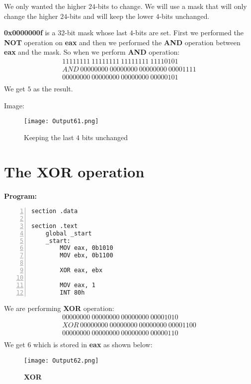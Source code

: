 \documentclass{article}
\begin{document}
We only wanted the higher $24$-bits to change. We will use a mask that will only change the higher $24$-bits and will keep the lower $4$-bits unchanged.

\textbf{0x0000000f} is a $32$-bit mask whose last $4$-bits are set. First we performed the \textbf{NOT} operation on \textbf{eax} and then we performed the \textbf{AND} operation between \textbf{eax} and the mask.
\newpage
So when we perform \textbf{AND} operation:
\begin{align*}
11111111\ 11111111\ 11111111\ 11110101 \\
AND\ 00000000\ 00000000\ 00000000\ 00001111 \\
\hline
00000000\ 00000000\ 00000000\ 00000101 \\
\end{align*}
We get $5$ as the result.

Image:
\begin{figure}[h]
\centering
\texttt{[image: Output61.png]}
\caption{Keeping the last $4$ bits unchanged}
\label{fig:fig5}
\end{figure}
\newpage
\section{The XOR operation}\label{sec:sec3}
\paragraph{}
\textbf{Program:}
\begin{Verbatim}[numbers=left, frame=single]
section .data

section .text
	global _start
	_start:
		MOV eax, 0b1010
		MOV ebx, 0b1100
		
		XOR eax, ebx
		
		MOV eax, 1
		INT 80h
\end{Verbatim}
We are performing \textbf{XOR} operation:
\begin{align*}
00000000\ 00000000\ 00000000\ 00001010 \\
XOR\ 00000000\ 00000000\ 00000000\ 00001100 \\
\hline
00000000\ 00000000\ 00000000\ 00000110 \\
\end{align*}
We get $6$ which is stored in \textbf{eax} as shown below:
\begin{figure}[h]
\centering
\texttt{[image: Output62.png]}
\caption{\textbf{XOR}}
\label{fig:fig6}
\end{figure}
\end{document}
